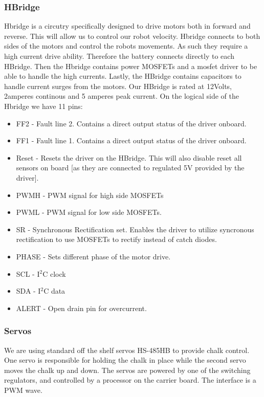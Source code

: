 \documentclass[12pt]{article}
\begin{document}
 \subsubsection{HBridge}
 Hbridge is a circutry specifically designed to drive motors both in forward and reverse. This will allow us to control our robot velocity. Hbridge connects to both sides of the motors and control the robots movements. As such they require a high current drive ability. Therefore the battery connects directly to each HBridge. Then the Hbridge contains power MOSFETs and a mosfet driver to be able to handle the high currents. Lastly, the HBridge contains capacitors to handle current surges from the motors. Our HBridge is rated at 12Volts, 2amperes continous and 5 amperes peak current.  On the logical side of the Hbridge we have 11 pins:
 \begin{itemize}
  \item FF2 - Fault line 2. Contains a direct output status of the driver onboard.
  \item FF1 - Fault line 1. Contains a direct output status of the driver onboard.
  \item Reset - Resets the driver on the HBridge. This will also disable reset all sensors on board [as they are connected to regulated 5V provided by the driver].
  \item PWMH - PWM signal for high side MOSFETs
  \item PWML - PWM signal for low side MOSFETs.
  \item SR - Synchronous Rectification set. Enables the driver to utilize syncronous rectification to use MOSFETs to rectify instead of catch diodes.
  \item PHASE - Sets different phase of the motor drive.
  \item SCL - I$^{\textrm{2}}$C  clock
  \item SDA - I$^{\textrm{2}}$C data
  \item ALERT - Open drain pin for overcurrent.
  \end{itemize}
  \subsubsection{Servos}
     We are using standard off the shelf servos HS-485HB to provide chalk control. One servo is responsible for holding the chalk in place while the second servo moves the chalk up and down. The servos are powered by one of the switching regulators, and controlled by a processor on the carrier board. The interface is a PWM wave.
\end{document}
